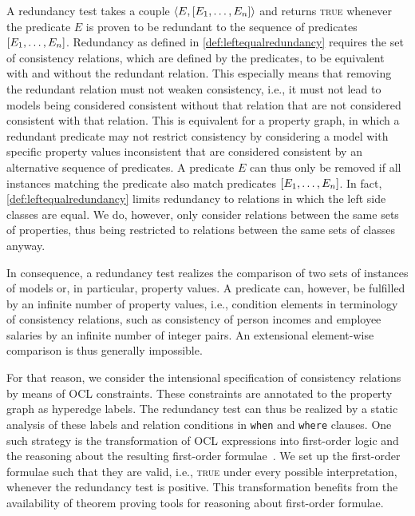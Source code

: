 
A redundancy test takes a couple $\langle E, [E_1, \dots, E_n] \rangle$ and returns \textsc{true} whenever the predicate $E$ is proven to be redundant to the sequence of predicates $[E_1, \dots, E_n]$.
Redundancy as defined in \autoref{def:leftequalredundancy} requires the set of consistency relations, which are defined by the predicates, to be equivalent with and without the redundant relation.
This especially means that removing the redundant relation must not weaken consistency, i.e., it must not lead to models being considered consistent without that relation that are not considered consistent with that relation.
This is equivalent for a property graph, in which a redundant predicate may not restrict consistency by considering a model with specific property values inconsistent that are considered consistent by an alternative sequence of predicates.
A predicate $E$ can thus only be removed if all instances matching the predicate also match predicates $[E_1, \dots, E_n]$.
In fact, \autoref{def:leftequalredundancy} limits redundancy to relations in which the left side classes are equal.
We do, however, only consider relations between the same sets of properties, thus being restricted to relations between the same sets of classes anyway.

In consequence, a redundancy test realizes the comparison of two sets of instances of models or, in particular, property values.
A predicate can, however, be fulfilled by an infinite number of property values, i.e., condition elements in terminology of consistency relations, such as consistency of person incomes and employee salaries by an infinite number of integer pairs.
An extensional element-wise comparison is thus generally impossible.

For that reason, we consider the intensional specification of consistency relations by means of \gls{OCL} constraints.
These constraints are annotated to the property graph as hyperedge labels.
The redundancy test can thus be realized by a static analysis of these labels and \qvtr relation conditions in \texttt{when} and \texttt{where} clauses.
One such strategy is the transformation of \gls{OCL} expressions into first-order logic and the reasoning about the resulting first-order formulae~\cite{beckert2002ocltranslation, berardi2005umlreasoning}.
We set up the first-order formulae such that they are valid, i.e., \textsc{true} under every possible interpretation, whenever the redundancy test is positive.
This transformation benefits from the availability of theorem proving tools for reasoning about first-order formulae.


